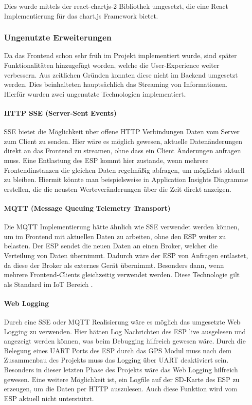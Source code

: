 Dies wurde mittels der react-chartjs-2 Bibliothek umgesetzt, die eine React Implementierung für das chart.js Framework bietet.

\subsubsection{Ungenutzte Erweiterungen}
Da das Frontend schon sehr früh im Projekt implementiert wurde, sind später Funktionalitäten hinzugefügt worden, welche die User-Experience weiter verbessern.
Aus zeitlichen Gründen konnten diese nicht im Backend umgesetzt werden.
Dies beinhalteten hauptsächlich das Streaming von Informationen.
Hierfür wurden zwei ungenutzte Technologien implementiert.

\paragraph{HTTP SSE (Server-Sent Events)}

SSE bietet die Möglichkeit über offene HTTP Verbindungen Daten vom Server zum Client zu senden.
Hier wäre es möglich gewesen, aktuelle Datenänderungen direkt an das Frontend zu streamen, ohne dass ein Client Änderungen anfragen muss.
Eine Entlastung des ESP kommt hier zustande, wenn mehrere Frontendinstanzen die gleichen Daten regelmäßig abfragen, um möglichst aktuell zu bleiben.
Hiermit könnte man beispielsweise in Application Insights Diagramme erstellen, die die neusten Werteveränderungen über die Zeit direkt anzeigen.

\paragraph{MQTT (Message Queuing Telemetry Transport)}
Die MQTT Implementierung hätte ähnlich wie SSE verwendet werden können, um im Frontend mit aktuellen Daten zu arbeiten, ohne den ESP weiter zu belasten.
Der ESP sendet die neuen Daten an einen Broker, welcher die Verteilung von Daten übernimmt.
Dadurch wäre der ESP von Anfragen entlastet, da diese der Broker als externes Gerät übernimmt.
Besonders dann, wenn mehrere Frontend-Clients gleichzeitig verwendet werden.
Diese Technologie gilt als Standard im IoT Bereich \autocite{front:mqtt}.

\paragraph{Web Logging}
Durch eine SSE oder MQTT Realisierung wäre es möglich das umgesetzte Web Logging zu verwenden.
Hier hätten Log Nachrichten des ESP live ausgelesen und angezeigt werden können, was beim Debugging hilfreich gewesen wäre.
Durch die Belegung eines UART Ports des ESP durch das GPS Modul muss nach dem Zusammenbau des Projekts muss das Logging über UART deaktiviert sein.
Besonders in dieser letzten Phase des Projekts wäre das Web Logging hilfreich gewesen.
Eine weitere Möglichkeit ist, ein Logfile auf der SD-Karte des ESP zu erzeugen, um die Daten per HTTP auszulesen.
Auch diese Funktion wird vom ESP aktuell nicht unterstützt.

